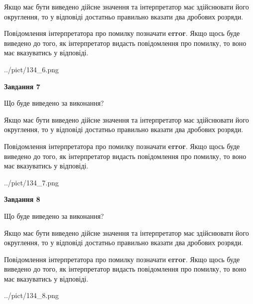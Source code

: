 \documentclass[12pt, ukrainian]{article}
\begin{document}
{\begin {Large}
Якщо має бути виведено дійсне значення та інтерпретатор має здійснювати його округлення, 
то у відповіді достатньо правильно вказати два дробових розряди.

Повідомлення інтерпретатора про помилку позначати \textbf{error}.
Якщо щось буде виведено до того, як інтерпретатор видасть повідомлення про помилку, 
то воно має вказуватись у відповіді. \par

\begin{center}
	{../pict/134_6.png}
\end{center}
\newpage

{\begin {center}\textbf{Завдання 7}\end {center}}\par
Що буде виведено за виконання? \par

Якщо має бути виведено дійсне значення та інтерпретатор має здійснювати його округлення, 
то у відповіді достатньо правильно вказати два дробових розряди.

Повідомлення інтерпретатора про помилку позначати \textbf{error}.
Якщо щось буде виведено до того, як інтерпретатор видасть повідомлення про помилку, 
то воно має вказуватись у відповіді. \par

\begin{center}
	{../pict/134_7.png}
\end{center}
\newpage

{\begin {center}\textbf{Завдання 8}\end {center}}\par
Що буде виведено за виконання? \par

Якщо має бути виведено дійсне значення та інтерпретатор має здійснювати його округлення, 
то у відповіді достатньо правильно вказати два дробових розряди.

Повідомлення інтерпретатора про помилку позначати \textbf{error}.
Якщо щось буде виведено до того, як інтерпретатор видасть повідомлення про помилку, 
то воно має вказуватись у відповіді. \par

\begin{center}
	{../pict/134_8.png}
\end{center}
\newpage


\end{Large}}
\end{document}
